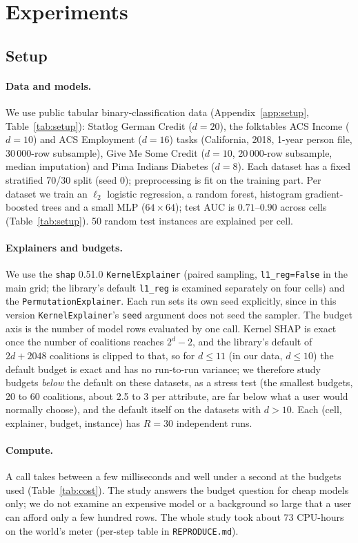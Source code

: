 \section{Experiments}
\label{sec:exp}
\subsection{Setup}
\paragraph{Data and models.}
We use public tabular binary-classification data (Appendix~\ref{app:setup}, Table~\ref{tab:setup}): Statlog German Credit ($d=20$), the folktables \citep{ding2021retiring} ACS Income ($d=10$) and ACS Employment ($d=16$) tasks (California, 2018, 1-year person file, 30\,000-row subsample), Give Me Some Credit ($d=10$, 20\,000-row subsample, median imputation) and Pima Indians Diabetes ($d=8$). Each dataset has a fixed stratified 70/30 split (seed 0); preprocessing is fit on the training part. Per dataset we train an $\ell_2$ logistic regression, a random forest, histogram gradient-boosted trees and a small MLP ($64\times64$); test AUC is $0.71$--$0.90$ across cells (Table~\ref{tab:setup}). 50 random test instances are explained per cell.
\paragraph{Explainers and budgets.}
We use the \texttt{shap} 0.51.0 \texttt{KernelExplainer} (paired sampling, \texttt{l1\_reg=False} in the main grid; the library's default \texttt{l1\_reg} is examined separately on four cells) and the \texttt{PermutationExplainer}. Each run sets its own seed explicitly, since in this version \texttt{KernelExplainer}'s \texttt{seed} argument does not seed the sampler. The budget axis is the number of model rows evaluated by one call. Kernel SHAP is exact once the number of coalitions reaches $2^d-2$, and the library's default of $2d+2048$ coalitions is clipped to that, so for $d\le11$ (in our data, $d\le10$) the default budget is exact and has no run-to-run variance; we therefore study budgets \emph{below} the default on these datasets, as a stress test (the smallest budgets, 20 to 60 coalitions, about 2.5 to 3 per attribute, are far below what a user would normally choose), and the default itself on the datasets with $d>10$. Each (cell, explainer, budget, instance) has $R=30$ independent runs.
\paragraph{Compute.}
A call takes between a few milliseconds and well under a second at the budgets used (Table~\ref{tab:cost}). The study answers the budget question for cheap models only; we do not examine an expensive model or a background so large that a user can afford only a few hundred rows. The whole study took about 73 CPU-hours on the world's meter (per-step table in \texttt{REPRODUCE.md}).

